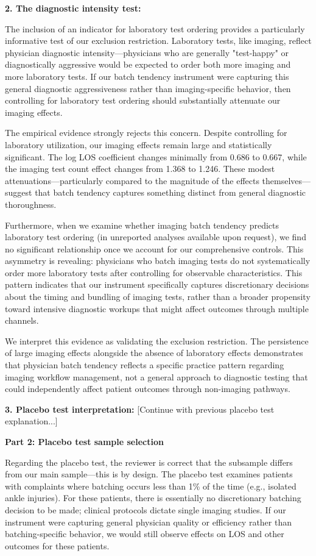 \documentclass[11pt]{article}
\newcommand{\1}{\hbox{\rm 1\kern-.35em 1}}
\begin{document}
{{{{\textbf{2. The diagnostic intensity test:}

The inclusion of an indicator for laboratory test ordering provides a particularly informative test of our exclusion restriction. Laboratory tests, like imaging, reflect physician diagnostic intensity—physicians who are generally "test-happy" or diagnostically aggressive would be expected to order both more imaging and more laboratory tests. If our batch tendency instrument were capturing this general diagnostic aggressiveness rather than imaging-specific behavior, then controlling for laboratory test ordering should substantially attenuate our imaging effects.

The empirical evidence strongly rejects this concern. Despite controlling for laboratory utilization, our imaging effects remain large and statistically significant. The log LOS coefficient changes minimally from 0.686 to 0.667, while the imaging test count effect changes from 1.368 to 1.246. These modest attenuations—particularly compared to the magnitude of the effects themselves—suggest that batch tendency captures something distinct from general diagnostic thoroughness.

Furthermore, when we examine whether imaging batch tendency predicts laboratory test ordering (in unreported analyses available upon request), we find no significant relationship once we account for our comprehensive controls. This asymmetry is revealing: physicians who batch imaging tests do not systematically order more laboratory tests after controlling for observable characteristics. This pattern indicates that our instrument specifically captures discretionary decisions about the timing and bundling of imaging tests, rather than a broader propensity toward intensive diagnostic workups that might affect outcomes through multiple channels.

We interpret this evidence as validating the exclusion restriction. The persistence of large imaging effects alongside the absence of laboratory effects demonstrates that physician batch tendency reflects a specific practice pattern regarding imaging workflow management, not a general approach to diagnostic testing that could independently affect patient outcomes through non-imaging pathways.

\textbf{3. Placebo test interpretation:}
[Continue with previous placebo test explanation...]
\color{black}

\textbf{Part 2: Placebo test sample selection}

Regarding the placebo test, the reviewer is correct that the subsample differs from our main sample—this is by design. The placebo test examines patients with complaints where batching occurs less than 1\% of the time (e.g., isolated ankle injuries). For these patients, there is essentially no discretionary batching decision to be made; clinical protocols dictate single imaging studies. If our instrument were capturing general physician quality or efficiency rather than batching-specific behavior, we would still observe effects on LOS and other outcomes for these patients.

}}}}
\end{document}
